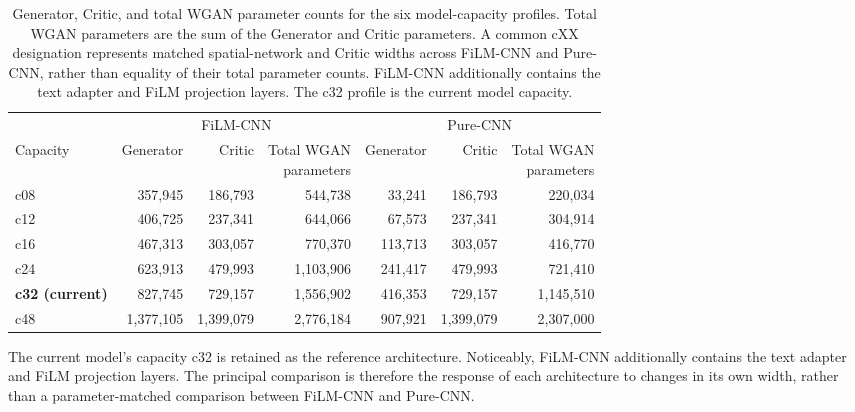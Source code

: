 \begin{table}[htbp]
\centering
\scriptsize
\setlength{\tabcolsep}{3pt}
\begin{tabular}{@{}lrrr@{\hspace{8pt}}rrr@{}}
\toprule
& \multicolumn{3}{c}{FiLM-CNN}
& \multicolumn{3}{c}{Pure-CNN} \\
\cmidrule(lr){2-4}\cmidrule(lr){5-7}
Capacity
& Generator
& Critic
& \shortstack{Total WGAN\\parameters}
& Generator
& Critic
& \shortstack{Total WGAN\\parameters} \\
\midrule
c08 & 357,945   & 186,793   & 544,738
    & 33,241    & 186,793   & 220,034 \\

c12 & 406,725   & 237,341   & 644,066
    & 67,573    & 237,341   & 304,914 \\

c16 & 467,313   & 303,057   & 770,370
    & 113,713   & 303,057   & 416,770 \\

c24 & 623,913   & 479,993   & 1,103,906
    & 241,417   & 479,993   & 721,410 \\

\textbf{c32 (current)}
    & 827,745   & 729,157   & 1,556,902
    & 416,353   & 729,157   & 1,145,510 \\

c48 & 1,377,105 & 1,399,079 & 2,776,184
    & 907,921   & 1,399,079 & 2,307,000 \\
\bottomrule
\end{tabular}
\caption{Generator, Critic, and total WGAN parameter counts for the six
model-capacity profiles. Total WGAN parameters are the sum of the Generator
and Critic parameters. A common cXX designation represents matched
spatial-network and Critic widths across FiLM-CNN and Pure-CNN, rather than
equality of their total parameter counts. FiLM-CNN additionally contains the
text adapter and FiLM projection layers. The c32 profile is the current model
capacity.}
\label{tab:ch3:capacity_parameter_counts}
\end{table}


The current model's capacity c32 is retained as the reference architecture.
Noticeably, FiLM-CNN additionally contains the text
adapter and FiLM projection layers.  The principal comparison is therefore
the response of each architecture to changes in its own width, rather than a
parameter-matched comparison between FiLM-CNN and Pure-CNN.


